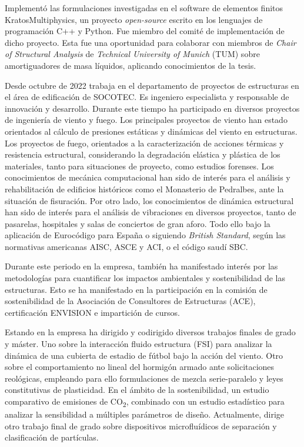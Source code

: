 \documentclass[11pt]{article}
\begin{document}
Implementó las formulaciones investigadas en el software de elementos finitos KratosMultiphysics, un proyecto \emph{open-source} escrito en los lenguajes de programación C++ y Python. Fue miembro del comité de implementación de dicho proyecto. Esta fue una oportunidad para colaborar con miembros de \emph{Chair of Structural Analysis} de \emph{Technical University of Munich} (TUM) sobre amortiguadores de masa líquidos, aplicando conocimientos de la tesis.

Desde octubre de 2022 trabaja en el departamento de proyectos de estructuras en el área de edificación de SOCOTEC. Es ingeniero especialista y responsable de innovación y desarrollo. Durante este tiempo ha participado en diversos proyectos de ingeniería de viento y fuego. Los principales proyectos de viento han estado orientados al cálculo de presiones estáticas y dinámicas del viento en estructuras. Los proyectos de fuego, orientados a la caracterización de acciones térmicas y resistencia estructural, considerando la degradación elástica y plástica de los materiales, tanto para situaciones de proyecto, como estudios forenses. Los conocimientos de mecánica computacional han sido de interés para el análisis y rehabilitación de edificios históricos como el Monasterio de Pedralbes, ante la situación de fisuración. Por otro lado, los conocimientos de dinámica estructural han sido de interés para el análisis de vibraciones en diversos proyectos, tanto de pasarelas, hospitales y salas de conciertos de gran aforo. Todo ello bajo la aplicación de Eurocódigo para España o siguiendo \emph{British Standard}, según las normativas americanas AISC, ASCE y ACI, o el código saudí SBC.

Durante este periodo en la empresa, también ha manifestado interés por las metodologías para cuantificar los impactos ambientales y sostenibilidad de las estructuras. Esto se ha manifestado en la participación en la comisión de sostenibilidad de la Asociación de Consultores de Estructuras (ACE), certificación ENVISION e impartición de cursos.

Estando en la empresa ha dirigido y codirigido diversos trabajos finales de grado y máster. Uno sobre la interacción fluido estructura (FSI) para analizar la dinámica de una cubierta de estadio de fútbol bajo la acción del viento. Otro sobre el comportamiento no lineal del hormigón armado ante solicitaciones reológicas, empleando para ello formulaciones de mezcla serie-paralelo y leyes constitutivas de plasticidad. En el ámbito de la sostenibilidad, un estudio comparativo de emisiones de CO\textsubscript{2}, combinado con un estudio estadístico para analizar la sensibilidad a múltiples parámetros de diseño. Actualmente, dirige otro trabajo final de grado sobre dispositivos microfluídicos de separación y clasificación de partículas.
\end{document}
